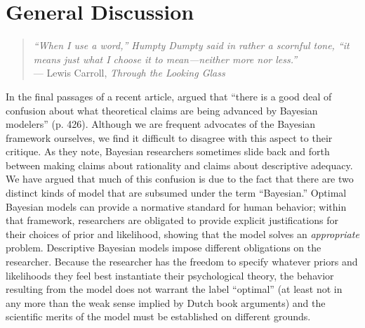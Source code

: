 \documentclass[doc,floatsintext]{apa6}
\begin{document}
\section*{General Discussion}

\begin{quote}
{\it ``When I use a word,'' Humpty Dumpty said in rather a scornful tone, ``it means just what I choose it to mean---neither more nor less.''} \\
\hspace*{2cm} --- Lewis Carroll, {\it Through the Looking Glass}
\end{quote}

In the final passages of a recent article,  argued that ``there is a good deal of confusion about what theoretical claims are being advanced by Bayesian modelers'' (p. 426). Although we are frequent advocates of the Bayesian framework ourselves, we find it difficult to disagree with this aspect to their critique. As they note, Bayesian researchers sometimes slide back and forth between making claims about rationality and claims about descriptive adequacy. We have argued that much of this confusion is due to the fact that there are two distinct kinds of model that are subsumed under the term ``Bayesian.'' Optimal Bayesian models can provide a normative standard for human behavior; within that framework, researchers are obligated to provide explicit justifications for their choices of prior and likelihood, showing that the model solves an {\it appropriate} problem. Descriptive Bayesian models impose different obligations on the researcher. Because the researcher has the freedom to specify whatever priors and likelihoods they feel best instantiate their psychological theory, the behavior resulting from the model does not warrant the label ``optimal'' (at least not in any more than the weak sense implied by Dutch book arguments) and the scientific merits of the model must be established on different grounds.
\end{document}
